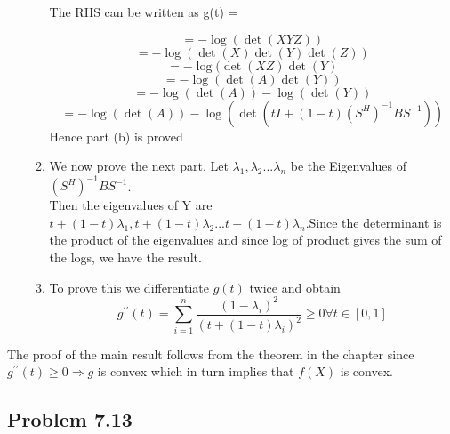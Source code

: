 \documentclass[letterpaper,12pt]{article}
\theoremstyle{definition}
\begin{document}
\begin{enumerate}
\begin{enumerate}
The RHS can be written as g(t) =

 \begin{equation*}
       = -\log(\det(XYZ))
 \end{equation*}
  \begin{equation*}
       = -\log(\det(X)\det(Y)\det(Z))
  \end{equation*}
   \begin{equation*}
           = -\log(\det(XZ)\det(Y)
   \end{equation*}
\begin{equation*}
        =-\log(\det(A)\det(Y))
\end{equation*}
\begin{equation*}
      =-\log(\det(A)) - \log(\det(Y))
\end{equation*}
  \begin{equation*}
      =-\log(\det(A)) - \log(\det(tI + (1-t)(S^H)^{-1}BS^{-1}))
  \end{equation*}
Hence part (b) is proved   

\item We now prove the next part. Let $\lambda_1, \lambda_2...\lambda_n$ be the Eigenvalues of $ (S^H)^{-1}BS^{-1} $.\\Then the eigenvalues of Y are $t+(1-t)\lambda_1, t+(1-t)\lambda_2...t+(1-t)\lambda_n$.Since the determinant is the product of the eigenvalues and since log of product gives the sum of the logs, we have the result.
    
    \item To prove this we differentiate $g(t)$ twice and obtain
    $$g^{\prime\prime}(t) = \sum_{i=1}^{n}\frac{(1-\lambda_i)^2}{(t+(1-t)\lambda_i)^2} \ge 0 \forall t \in [0,1]$$
    \end{enumerate}
    
\end{enumerate}
The proof of the main result follows from the theorem in the chapter since $g^{\prime\prime}(t) \ge 0 \Rightarrow g$ is convex which in turn implies that $f(X)$ is convex.

\subsection*{Problem 7.13}
\end{document}
